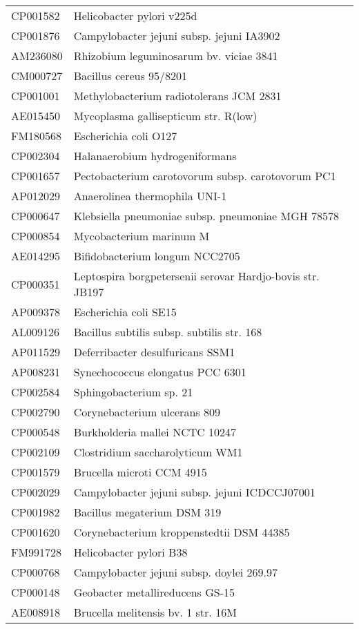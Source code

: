 \begin{longtable}{ll}
CP001582 & Helicobacter pylori v225d\\
CP001876 & Campylobacter jejuni subsp. jejuni IA3902\\
AM236080 & Rhizobium leguminosarum bv. viciae 3841\\
CM000727 & Bacillus cereus 95/8201\\
CP001001 & Methylobacterium radiotolerans JCM 2831\\
AE015450 & Mycoplasma gallisepticum str. R(low)\\
FM180568 & Escherichia coli O127\\
CP002304 & Halanaerobium hydrogeniformans\\
CP001657 & Pectobacterium carotovorum subsp. carotovorum PC1\\
AP012029 & Anaerolinea thermophila UNI-1\\
CP000647 & Klebsiella pneumoniae subsp. pneumoniae MGH 78578\\
CP000854 & Mycobacterium marinum M\\
AE014295 & Bifidobacterium longum NCC2705\\
CP000351 & Leptospira borgpetersenii serovar Hardjo-bovis str. JB197\\
AP009378 & Escherichia coli SE15\\
AL009126 & Bacillus subtilis subsp. subtilis str. 168\\
AP011529 & Deferribacter desulfuricans SSM1\\
AP008231 & Synechococcus elongatus PCC 6301\\
CP002584 & Sphingobacterium sp. 21\\
CP002790 & Corynebacterium ulcerans 809\\
CP000548 & Burkholderia mallei NCTC 10247\\
CP002109 & Clostridium saccharolyticum WM1\\
CP001579 & Brucella microti CCM 4915\\
CP002029 & Campylobacter jejuni subsp. jejuni ICDCCJ07001\\
CP001982 & Bacillus megaterium DSM 319\\
CP001620 & Corynebacterium kroppenstedtii DSM 44385\\
FM991728 & Helicobacter pylori B38\\
CP000768 & Campylobacter jejuni subsp. doylei 269.97\\
CP000148 & Geobacter metallireducens GS-15\\
AE008918 & Brucella melitensis bv. 1 str. 16M\\

\end{longtable}
